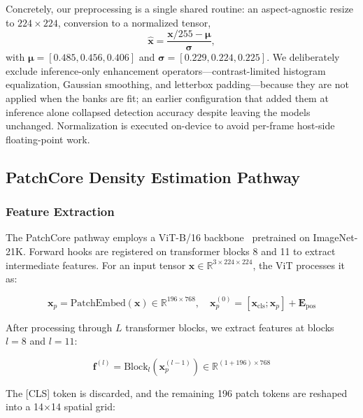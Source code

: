 \documentclass[journal]{IEEEtran}
\begin{document}
Concretely, our preprocessing is a single shared routine: an aspect-agnostic resize to $224\times224$, conversion to a normalized tensor,
\begin{equation}
    \hat{\mathbf{x}} = \frac{\mathbf{x}/255 - \bm{\mu}}{\bm{\sigma}},
    \label{eq:normalize}
\end{equation}
with $\bm{\mu} = [0.485, 0.456, 0.406]$ and $\bm{\sigma} = [0.229, 0.224, 0.225]$. We deliberately exclude inference-only enhancement operators---contrast-limited histogram equalization, Gaussian smoothing, and letterbox padding---because they are not applied when the banks are fit; an earlier configuration that added them at inference alone collapsed detection accuracy despite leaving the models unchanged. Normalization is executed on-device to avoid per-frame host-side floating-point work.

\subsection{PatchCore Density Estimation Pathway}
\label{sec:patchcore}

\subsubsection{Feature Extraction}

The PatchCore pathway employs a ViT-B/16 backbone~\cite{dosovitskiy2021vit} pretrained on ImageNet-21K. Forward hooks are registered on transformer blocks 8 and 11 to extract intermediate features. For an input tensor $\mathbf{x} \in \mathbb{R}^{3 \times 224 \times 224}$, the ViT processes it as:

\begin{equation}
    \mathbf{x}_p = \text{PatchEmbed}(\mathbf{x}) \in \mathbb{R}^{196 \times 768}, \quad \mathbf{x}_p^{(0)} = [\mathbf{x}_{\text{cls}}; \mathbf{x}_p] + \mathbf{E}_{\text{pos}}
    \label{eq:vit_embed}
\end{equation}

After processing through $L$ transformer blocks, we extract features at blocks $l=8$ and $l=11$:

\begin{equation}
    \mathbf{f}^{(l)} = \text{Block}_l(\mathbf{x}_p^{(l-1)}) \in \mathbb{R}^{(1+196) \times 768}
    \label{eq:vit_features}
\end{equation}

The [CLS] token is discarded, and the remaining 196 patch tokens are reshaped into a 14$\times$14 spatial grid:
\end{document}
